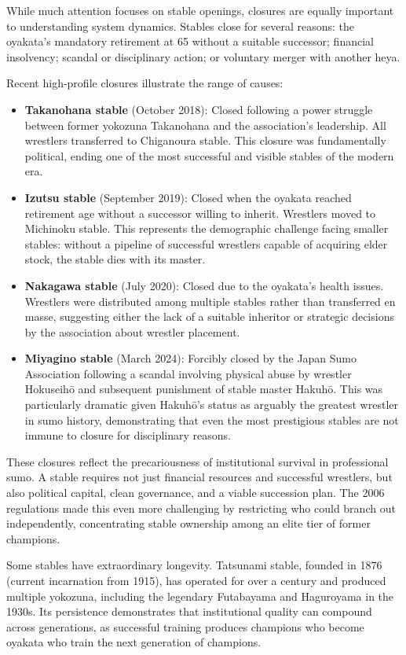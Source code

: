 While much attention focuses on stable openings, closures are equally important to understanding system dynamics. Stables close for several reasons: the oyakata's mandatory retirement at 65 without a suitable successor; financial insolvency; scandal or disciplinary action; or voluntary merger with another heya.

Recent high-profile closures illustrate the range of causes:

\begin{itemize}
\item \textbf{Takanohana stable} (October 2018): Closed following a power struggle between former yokozuna Takanohana and the association's leadership. All wrestlers transferred to Chiganoura stable. This closure was fundamentally political, ending one of the most successful and visible stables of the modern era.
\item \textbf{Izutsu stable} (September 2019): Closed when the oyakata reached retirement age without a successor willing to inherit. Wrestlers moved to Michinoku stable. This represents the demographic challenge facing smaller stables: without a pipeline of successful wrestlers capable of acquiring elder stock, the stable dies with its master.
\item \textbf{Nakagawa stable} (July 2020): Closed due to the oyakata's health issues. Wrestlers were distributed among multiple stables rather than transferred en masse, suggesting either the lack of a suitable inheritor or strategic decisions by the association about wrestler placement.
\item \textbf{Miyagino stable} (March 2024): Forcibly closed by the Japan Sumo Association following a scandal involving physical abuse by wrestler Hokuseihō and subsequent punishment of stable master Hakuhō. This was particularly dramatic given Hakuhō's status as arguably the greatest wrestler in sumo history, demonstrating that even the most prestigious stables are not immune to closure for disciplinary reasons.
\end{itemize}

These closures reflect the precariousness of institutional survival in professional sumo. A stable requires not just financial resources and successful wrestlers, but also political capital, clean governance, and a viable succession plan. The 2006 regulations made this even more challenging by restricting who could branch out independently, concentrating stable ownership among an elite tier of former champions.

Some stables have extraordinary longevity. Tatsunami stable, founded in 1876 (current incarnation from 1915), has operated for over a century and produced multiple yokozuna, including the legendary Futabayama and Haguroyama in the 1930s. Its persistence demonstrates that institutional quality can compound across generations, as successful training produces champions who become oyakata who train the next generation of champions.

